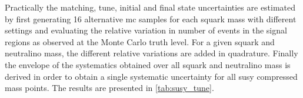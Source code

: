 Practically the matching, tune, initial and final state uncertainties are
estimated by first generating 16 alternative \gls{mc} samples for each squark
mass with different settings and evaluating the relative variation in number of
events in the signal regions as observed at the Monte Carlo truth level. For a
given squark and neutralino mass, the different relative variations are added in
quadrature. Finally the envelope of the systematics obtained over all squark and
neutralino mass is derived in order to obtain a single systematic uncertainty
for all \gls{susy} compressed mass points. The results are presented in
\cref{tab:susy_tune}.
\begin{table}[!htb]
  \centering
\caption{Theoretical uncertainty in \% on the \gls{susy} compressed spectra
  signal region acceptance as function of the $\met$ bin in the signal region,
  from tune, matching, initial and final state radiation systematic
  uncertainties. The final value is a common envelope valid for all the
  \gls{susy} compressed models.}
  \label{tab:susy_tune}
\end{table}
